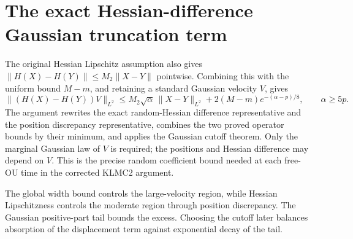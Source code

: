 \documentclass[11pt,a4paper]{article}
\begin{document}
\section{\texorpdfstring{The exact Hessian-difference Gaussian truncation term}{The exact Hessian-difference Gaussian truncation term}}


The original Hessian Lipschitz assumption also gives \(\|H(X)-H(Y)\|\le M_2\|X-Y\|\) pointwise. Combining this with the uniform bound \(M-m\), and retaining a standard Gaussian velocity \(V\), gives \[\|(H(X)-H(Y))V\|_{L^2}\le M_2\sqrt\alpha\,\|X-Y\|_{L^2}+2(M-m)e^{-(\alpha-p)/8},\qquad\alpha\ge5p.\] The argument rewrites the exact random-Hessian difference representative and the position discrepancy representative, combines the two proved operator bounds by their minimum, and applies the Gaussian cutoff theorem. Only the marginal Gaussian law of \(V\) is required; the positions and Hessian difference may depend on \(V\). This is the precise random coefficient bound needed at each free-OU time in the corrected KLMC2 argument.



The global width bound controls the large-velocity region, while Hessian Lipschitzness controls the moderate region through position discrepancy. The Gaussian positive-part tail bounds the excess. Choosing the cutoff later balances absorption of the displacement term against exponential decay of the tail.
\end{document}
